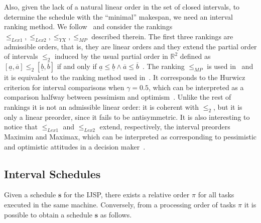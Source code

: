 \documentclass[icae]{iosart2x}
\newcommand{\reviewed}[1]{#1} %
\begin{document}
Also, given the lack of a natural \reviewed{linear} order in the set of closed intervals, to determine the schedule with the ``minimal'' makespan, we need an interval ranking method. We follow~\cite{Diaz2022robust} and consider the rankings $ \leq_{Lex1}, \leq_{Lex2}, \leq_{YX}, \leq_{MP}$ \reviewed{described} therein. \reviewed{The first three rankings are admissible orders, that is, they are linear orders and they extend the partial order of intervals $\leq_2$ induced by the usual partial order in $\mathbb{R}^2$ defined as $[\underline{a},\overline{a}] \leq_2 [\underline{b}, \overline{b}]$ if and only if $\underline{a} \leq \underline{b} \wedge \overline{a} \leq \overline{b}$~\cite{Bustince2013}. } The ranking $\leq_{MP}$ is used in~\cite{Diaz2020genetic,Diaz2022} and it is equivalent to the ranking method used in~\cite{Lei2012c}. \reviewed{It corresponds to the Hurwicz criterion for interval comparisons when $\gamma=0.5$, which can be interpreted as a comparison halfway between pessimism and optimism~\cite{Destercke2015}.  Unlike the rest of rankings it is not an admissible linear order: it is coherent with $\leq_2$, but it is only a linear preorder, since it fails to be antisymmetric. It is also interesting to notice that $\leq_{Lex1}$ and $\leq_{Lex2}$ extend, respectively, the interval preorders Maximim and Maximax, which can be interpreted as corresponding to pessimistic and optimistic attitudes in a decision maker~\cite{Destercke2015}.}

\subsection{Interval Schedules}\label{subsecIntervalSchedules}
Given a schedule $\boldsymbol{s}$ for the IJSP, there exists a relative order $\pi$ for all tasks executed in the same machine. Conversely, from a processing order of tasks $\pi$ it is possible to obtain a schedule $\boldsymbol{s}$ as follows.
\end{document}
